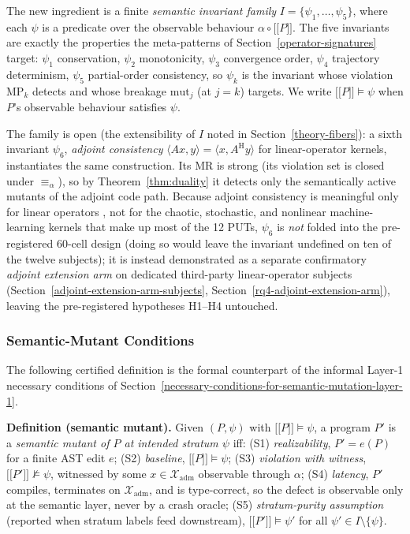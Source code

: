\documentclass[manuscript,screen,review]{acmart}
\begin{document}
The new ingredient is a finite \emph{semantic invariant family}
$I = \{\psi_1, \dots, \psi_5\}$, where each $\psi$ is a predicate over
the observable behaviour $\alpha \circ \mathopen{\lbrack\!\lbrack} P \mathclose{\rbrack\!\rbrack}$. The five
invariants are exactly the properties the meta-patterns of Section~\ref{operator-signatures} target:
$\psi_1$ conservation, $\psi_2$ monotonicity, $\psi_3$ convergence order,
$\psi_4$ trajectory determinism, $\psi_5$ partial-order consistency, so
$\psi_k$ is the invariant whose violation MP$_k$ detects and whose
breakage $\mathrm{mut}_j$ (at $j=k$) targets. We write
$\mathopen{\lbrack\!\lbrack} P \mathclose{\rbrack\!\rbrack} \models \psi$ when $P$'s observable behaviour
satisfies $\psi$.

The family is open (the extensibility of $I$ noted in Section~\ref{theory-fibers}): a sixth
invariant $\psi_6$, \emph{adjoint consistency}
$\langle A x, y\rangle = \langle x, A^{\mathrm{H}} y\rangle$ for
linear-operator kernels, instantiates the same construction. Its MR is
strong (its violation set is closed under $\equiv_\alpha$), so by
Theorem~\ref{thm:duality} it detects only the semantically active mutants of the adjoint code
path. Because adjoint consistency is meaningful only for linear operators
, not for the chaotic, stochastic, and nonlinear machine-learning
kernels that make up most of the 12 PUTs, $\psi_6$ is \emph{not} folded
into the pre-registered 60-cell design (doing so would leave the invariant
undefined on ten of the twelve subjects); it is instead demonstrated as a
separate confirmatory \emph{adjoint extension arm} on dedicated
third-party linear-operator subjects (Section~\ref{adjoint-extension-arm-subjects}, Section~\ref{rq4-adjoint-extension-arm}), leaving the
pre-registered hypotheses H1--H4 untouched.

\subsubsection{Semantic-Mutant Conditions}\label{theory-s1s5}

The following certified definition is the formal counterpart of the
informal Layer-1 necessary conditions of Section~\ref{necessary-conditions-for-semantic-mutation-layer-1}.

\textbf{Definition (semantic mutant).} Given $(P, \psi)$ with
$\mathopen{\lbrack\!\lbrack} P \mathclose{\rbrack\!\rbrack} \models \psi$, a program $P'$ is a
\emph{semantic mutant of $P$ at intended stratum $\psi$} iff: (S1)
\emph{realizability}, $P' = e(P)$ for a finite AST edit $e$; (S2)
\emph{baseline}, $\mathopen{\lbrack\!\lbrack} P \mathclose{\rbrack\!\rbrack} \models \psi$; (S3)
\emph{violation with witness},
$\mathopen{\lbrack\!\lbrack} P' \mathclose{\rbrack\!\rbrack} \not\models \psi$, witnessed by some
$x \in \mathcal{X}_{\mathrm{adm}}$ observable through $\alpha$; (S4)
\emph{latency}, $P'$ compiles, terminates on $\mathcal{X}_{\mathrm{adm}}$,
and is type-correct, so the defect is observable only at the semantic
layer, never by a crash oracle; (S5) \emph{stratum-purity assumption}
(reported when stratum labels feed downstream),
$\mathopen{\lbrack\!\lbrack} P' \mathclose{\rbrack\!\rbrack} \models \psi'$ for all
$\psi' \in I \setminus \{\psi\}$.
\end{document}
